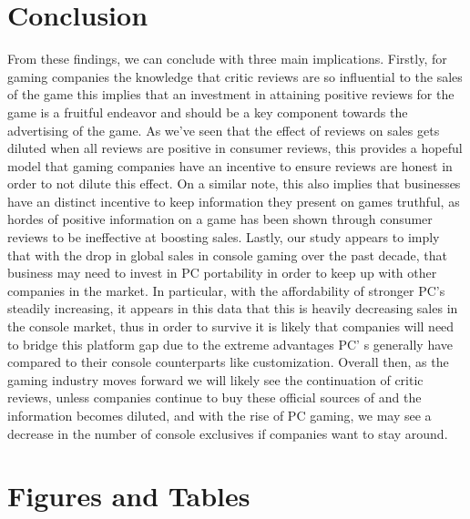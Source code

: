 \documentclass[12pt,english]{article}
\begin{document}
\section{Conclusion}\label{sec:conclusion}
From these findings, we can conclude with three main implications. Firstly, for gaming 
companies the knowledge that critic reviews are so influential to the sales of the game this 
implies that an investment in attaining positive reviews for the game is a fruitful endeavor and 
should be a key component towards the advertising of the game. As we’ve seen that the effect of 
reviews on sales gets diluted when all reviews are positive in consumer reviews, this provides a 
hopeful model that gaming companies have an incentive to ensure reviews are honest in order to 
not dilute this effect. On a similar note, this also implies that businesses have an distinct 
incentive to keep information they present on games truthful, as hordes of positive information 
on a game has been shown through consumer reviews to be ineffective at boosting sales. Lastly, 
our study appears to imply that with the drop in global sales in console gaming over the past 
decade, that business may need to invest in PC portability in order to keep up with other 
companies in the market. In particular, with the affordability of stronger PC’s steadily increasing, 
it appears in this data that this is heavily decreasing sales in the console market, thus in order to 
survive it is likely that companies will need to bridge this platform gap due to the extreme 
advantages PC’ s generally have compared to their console counterparts like customization. 
Overall then, as the gaming industry moves forward we will likely see the continuation of critic 
reviews, unless companies continue to buy these official sources of and the information becomes 
diluted, and with the rise of PC gaming, we may see a decrease in the number of console 
exclusives if companies want to stay around.


\vfill
\pagebreak{}
\begin{spacing}{1.0}


\end{spacing}

\vfill
\pagebreak{}
\clearpage

\section*{Figures and Tables}\label{sec:figTables}
\end{document}
